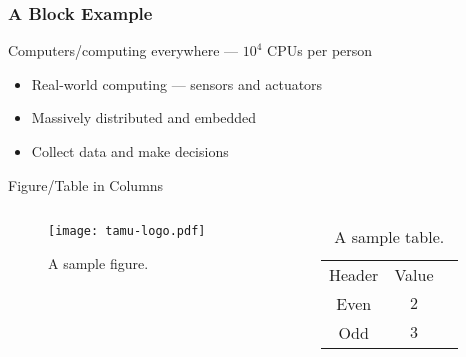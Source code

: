 \documentclass[onlycurpagenum,infolines,xcolor=table]{beamer}
\begin{document}
\begin{frame}
  \frametitle{A Block Example}
  \begin{block}{Computers/computing everywhere --- $10^4$ CPUs per person}
    \begin{itemize}
      \item Real-world computing --- sensors and actuators
      \item Massively distributed and embedded
      \item Collect data and make decisions
    \end{itemize}
  \end{block}
\end{frame}

\begin{frame}{Figure/Table in Columns}
  \begin{columns}
    \begin{column}{.5\textwidth}
      \begin{figure}[htbp]
        \centering
        \texttt{[image: tamu-logo.pdf]}
        \caption{A sample figure.}
      \end{figure}
    \end{column}
    \begin{column}{.5\textwidth}
      \begin{table}[htbp]
        \centering
        \caption{A sample table.}
        \label{tab:sample}
        \begin{tabular}{ccc}
          \rowcolor{tableheader}
          Header & Value \\
          Even & $2$\\
          Odd & $3$\\
        \end{tabular}
      \end{table}
    \end{column}
  \end{columns}
\end{frame}
\end{document}
